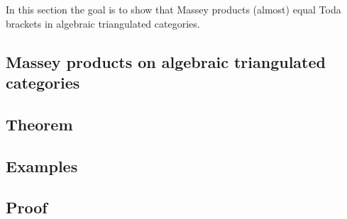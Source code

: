 In this section the goal is to show that Massey products (almost) equal Toda brackets in algebraic triangulated categories.

\subsection{Massey products on algebraic triangulated categories}


\subsection{Theorem}


\subsection{Examples}


\subsection{Proof}
